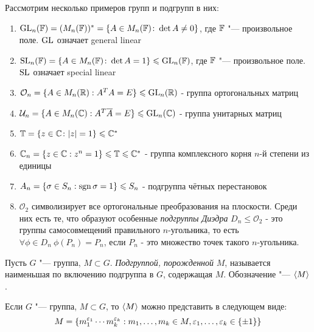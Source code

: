 \begin{example}
	Рассмотрим несколько примеров групп и подгрупп в них:
	\begin{enumerate}
		\item $\operatorname{GL}_n(\mathbb{F}) = (M_n(\mathbb{F}))^* = \{A \in M_n(\mathbb{F}) \colon \det{A} \ne 0\}$, где $\mathbb{F}$ "--- произвольное поле. $\operatorname{GL}$ означает general linear
		
		\item $\operatorname{SL}_n(\mathbb{F}) = \{A \in M_n(\mathbb{F}) \colon \det A = 1\} \leqslant \operatorname{GL}_n(\mathbb{F})$, где $\mathbb{F}$ "--- произвольное поле. $\operatorname{SL}$ означает special linear
		
		\item $\mathcal{O}_n = \{A \in M_n(\mathbb{R}): A^TA = E\} \leqslant \operatorname{GL}_n(\mathbb{R})$ - группа ортогональных матриц
		
		\item $\mathcal{U}_n = \{A \in M_n(\mathbb{C}): A^T\overline{A} = E\} \leqslant \operatorname{GL}_n(\mathbb{C})$ - группа унитарных матриц
		
		\item $\mathbb{T} = \{z \in \mathbb{C} \colon |z| = 1\} \leqslant \mathbb{C}^*$
		
		\item $\mathbb{C}_n = \{z \in \mathbb{C}: z^n = 1\} \leqslant \mathbb{T} \leqslant \mathbb{C}^*$ - группа комплексного корня $n$-й степени из единицы
		
		\item $A_n = \{\sigma \in S_n: \operatorname{\mathop{sgn}}\sigma = 1\} \leqslant S_n$ - подгруппа чётных перестановок
		
		\item $\mathcal{O}_2$ символизирует все ортогональные преобразования на плоскости. Среди них есть те, что образуют особенные \textit{подгруппы Диэдра} $D_n \le \mathcal{O}_2$ - это группы самосовмещений правильного $n$-угольника, то есть $\forall \phi \in D_n\ \phi(P_n) = P_n$, если $P_n$ - это множество точек такого $n$-угольника.
	\end{enumerate}
\end{example}

\begin{definition}
	Пусть $G$ "--- группа, $M \subset G$. \textit{Подгруппой, порожденной} $M$, называется наименьшая по включению подгруппа в $G$, содержащая $M$. Обозначение "--- $\langle M\rangle$.
\end{definition}

\begin{reminder}
	Если $G$ "--- группа, $M \subset G$, то $\left\langle M\right\rangle$ можно представить в следующем виде:
	\[
		M = \{m_1^{\eps_1}\dotsm m_k^{\eps_k}: m_1, \dotsc, m_k \hm\in M, \eps_1, \dotsc, \eps_k \in \{\pm1\}\}
	\]
\end{reminder}

